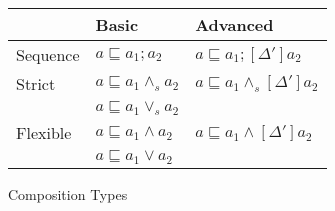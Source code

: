 \documentclass[12pt,journal,letterpaper,onecolumn]{IEEEtran}
\begin{document}
\begin{figure}
\begin{minipage}{6in}
\footnotesize
\begin{center}
\begin{tabular}{|l|l|l|}
\hline
& Basic & Advanced \\
\hline
Sequence & $a \sqsubseteq a_1;a_2$ & $a \sqsubseteq a_1;[\Delta']a_2$ \\
\hline
 Strict & $a \sqsubseteq a_1 \wedge_s a_2$ & $a \sqsubseteq
a_1
\wedge_s [\Delta'] a_2 $ \\
 & $a \sqsubseteq a_1 \vee_s a_2$ & \\
\hline
Flexible & $a \sqsubseteq a_1 \wedge a_2$ & $a\sqsubseteq a_1 \wedge [\Delta']a_2$ \\
& $a\sqsubseteq a_1 \vee a_2$ & \\
\hline
\end{tabular}
\end{center}
\normalsize
\end{minipage}
\caption{Composition Types} \label{fig:compositionTypes}

\end{figure}
\end{document}
